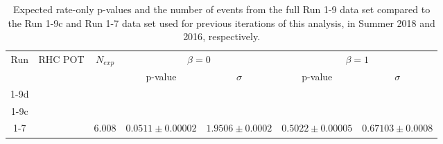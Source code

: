 \begin{table}
	\centering
	\begin{tabular}{|c|c|c|c|c|c|c|}
		\hline
		\multirow{2}{*}{Run} & \multirow{2}{*}{RHC POT}   & \multirow{2}{*}{$N_{exp}$}    & \multicolumn{2}{|c|}{$\beta=0$} & \multicolumn{2}{|c|}{$\beta=1$} \\
		\cline{4-7}     				
		     		         &                            &   				 	          & p-value        & $\sigma$       & p-value      & $\sigma$         \\
		\hline
		
		
		1-9d                 & \TotalPotNuBarRunOneNine   & \NskOscExpectationNueBarRunOneNineD & \pvalRateOnlyBetaZeroAsimovARunOneNineD & \sigmaRateOnlyBetaZeroAsimovARunOneNineD & \pvalRateOnlyBetaOneAsimovARunOneNineD  & \sigmaRateOnlyBetaOneAsimovARunOneNineD \\
		\hline
		
		
		1-9c                 & \TotalPotNuBarRunOneNineC  & \NskOscExpectationNueBarRunOneNineC & \pvalRateOnlyBetaZeroAsimovA & \sigmaRateOnlyBetaZeroAsimovA & \pvalRateOnlyBetaOneAsimovA & \sigmaRateOnlyBetaOneAsimovA \\
		\hline
		
		
		1-7                  & \TotalPotNuBarRunOneSevenC & 6.008	  & $0.0511 \pm 0.00002$  & $1.9506 \pm 0.0002$		 & $0.5022 \pm 0.00005$   & $0.67103 \pm 0.0008$ \\
		\hline
	\end{tabular}
	\caption{Expected rate-only p-values and the number of events from the full Run 1-9 data set compared to the Run 1-9c and Run 1-7 data set used for previous iterations of this analysis, in Summer 2018 and 2016\cite{OurRun16AntiNueBarAppearanceAnalysis3Flavour}, respectively.}
	\label{tab:sensitivity_comparison_rate_R19d_R17}
\end{table}


